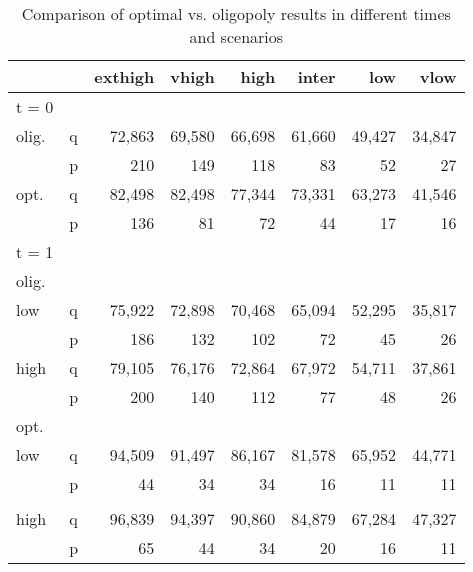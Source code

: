 \begin{table}
\centering
\caption{Comparison of optimal vs. oligopoly results in different times and scenarios}
\begin{tabular}{llrrrrrr}
\hline
\hline
           &            &    exthigh &      vhigh &       high &      inter &        low &       vlow \\
\hline
     t = 0 &            &            &            &            &            &            &            \\
\hline
 olig. &          q &     72,863 &     69,580 &     66,698 &     61,660 &     49,427 &     34,847 \\

           &          p &        210 &        149 &        118 &         83 &         52 &         27 \\
\hline
   opt. &          q &     82,498 &     82,498 &     77,344 &     73,331 &     63,273 &     41,546 \\

           &          p &        136 &         81 &         72 &         44 &         17 &         16 \\
\hline
\hline
     t = 1 &            &            &            &            &            &            &            \\

 olig. &            &            &            &            &            &            &            \\

       low &          q &     75,922 &     72,898 &     70,468 &     65,094 &     52,295 &     35,817 \\

           &          p &        186 &        132 &        102 &         72 &         45 &         26 \\

      high &          q &     79,105 &     76,176 &     72,864 &     67,972 &     54,711 &     37,861 \\

           &          p &        200 &        140 &        112 &         77 &         48 &         26 \\
\hline
   opt. &            &            &            &            &            &            &            \\
       low &          q &     94,509 &     91,497 &     86,167 &     81,578 &     65,952 &     44,771 \\
           &          p &         44 &         34 &         34 &         16 &         11 &         11 \\
           &            &            &            &            &            &            &            \\
      high &          q &     96,839 &     94,397 &     90,860 &     84,879 &     67,284 &     47,327 \\
           &          p &         65 &         44 &         34 &         20 &         16 &         11 \\
\hline
\hline
\end{tabular}  


\end{table}
